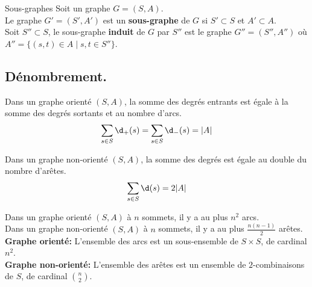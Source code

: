 \documentclass[french, 11pt]{article}
\begin{document}
\vspace*{-0.8cm}

\begin{defi}{Sous-graphes}{}
    Soit un graphe $G=(S,A)$.\\
    Le graphe $G'=(S',A')$ est un \textbf{sous-graphe} de $G$ si $S'\subset S$ et $A'\subset A$.\\
    Soit $S''\subset S$, le sous-graphe \textbf{induit} de $G$ par $S''$ est le graphe $G''=(S'',A'')$ où $A''=\{(s,t)\in A\mid s,t\in S''\}$.
\end{defi}

\vspace*{-0.8cm}

\subsection{Dénombrement.}

\begin{prop}{}{}
    Dans un graphe orienté $(S,A)$, la somme des degrés entrants est égale à la somme des degrés sortants et au nombre d'arcs.
    \begin{equation*}
        \sum_{s\in S}\d_+(s)=\sum_{s\in S}\d_-(s)=|A|
    \end{equation*}
\end{prop}

\vspace*{-0.8cm}

\begin{prop}{}{}
    Dans un graphe non-orienté $(S,A)$, la somme des degrés est égale au double du nombre d'arêtes.
    \begin{equation*}
        \sum_{s\in S}\d(s)=2|A|
    \end{equation*} 
\end{prop}

\vspace*{-0.8cm}

\begin{prop}{}{}
    Dans un graphe orienté $(S,A)$ à $n$ sommets, il y a au plus $n^2$ arcs.\\
    Dans un graphe non-orienté $(S,A)$ à $n$ sommets, il y a au plus $\frac{n(n-1)}{2}$ arêtes.
    \tcblower
    \textbf{Graphe orienté:} L'ensemble des arcs est un sous-ensemble de $S\times S$, de cardinal $n^2$.\\
    \textbf{Graphe non-orienté:} L'ensemble des arêtes est un ensemble de $2$-combinaisons de $S$, de cardinal $\binom{n}{2}$.
\end{prop}
\end{document}
